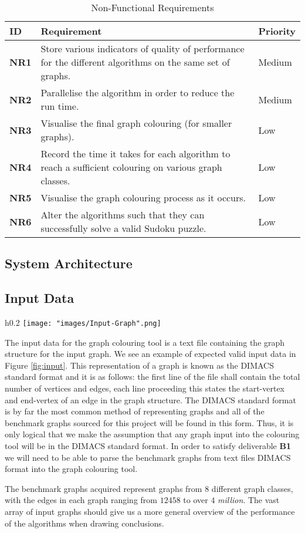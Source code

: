 \documentclass[12pt,a4paper]{article}
\begin{document}
\begin{longtable}{|p{1.2cm}|p{12cm}|p{1.4cm}|}
\caption{Non-Functional Requirements}\\
\hline
\label{non-functional}
\bf{ID} & \bf{Requirement} & \bf{Priority} \\ \hline
\textbf{NR1} & Store various indicators of quality of performance for the different algorithms on the same set of graphs. & Medium \\ \hline
\textbf{NR2} & Parallelise the algorithm in order to reduce the run time. & Medium \\ \hline
\textbf{NR3} & Visualise the final graph colouring (for smaller graphs). & Low \\ \hline
\textbf{NR4} & Record the time it takes for each algorithm to reach a sufficient colouring on various graph classes. & Low \\ \hline
\textbf{NR5} & Visualise the graph colouring process as it occurs. & Low \\ \hline
\textbf{NR6} & Alter the algorithms such that they can successfully solve a valid Sudoku puzzle. & Low \\ \hline
\end{longtable}

\subsection*{System Architecture}
\subsection*{Input Data}
\begin{wrapfigure}{h}{0.2\textwidth}
\texttt{[image: "images/Input-Graph".png]}
\caption{An extract of an input graph in DIMACS standard format.}
\label{fig:input}
\end{wrapfigure}
\noindent
The input data for the graph colouring tool is a text file containing the graph structure for the input graph. We see an example of expected valid input data in Figure \ref{fig:input}. This representation of a graph is known as the DIMACS standard format and it is as follows: the first line of the file shall contain the total number of vertices and edges, each line proceeding this states the start-vertex and end-vertex of an edge in the graph structure. The DIMACS standard format is by far the most common method of representing graphs and all of the benchmark graphs sourced for this project will be found in this form. Thus, it is only logical that we make the assumption that any graph input into the colouring tool will be in the DIMACS standard format. In order to satisfy deliverable \textbf{B1} we will need to be able to parse the benchmark graphs from text files DIMACS format into the graph colouring tool.
\par The benchmark graphs acquired represent graphs from $8$ different graph classes, with the edges in each graph ranging from $12458$ to over $4$ \textit{million}. The vast array of input graphs should give us a more general overview of the performance of the algorithms when drawing conclusions.
\end{document}
